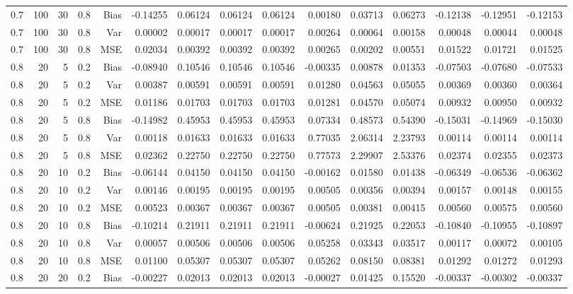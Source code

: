 \begin{table}[!htbp]
\begin{tabular}{lrrrrrrrrrrrrrr}
0.7 & 100 & 30 & 0.8 & Bias & -0.14255 & 0.06124 & 0.06124 & 0.06124 & 0.00180 & 0.03713 & 0.06273 & -0.12138 & -0.12951 & -0.12153 \\
0.7 & 100 & 30 & 0.8 & Var & 0.00002 & 0.00017 & 0.00017 & 0.00017 & 0.00264 & 0.00064 & 0.00158 & 0.00048 & 0.00044 & 0.00048 \\
0.7 & 100 & 30 & 0.8 & MSE & 0.02034 & 0.00392 & 0.00392 & 0.00392 & 0.00265 & 0.00202 & 0.00551 & 0.01522 & 0.01721 & 0.01525 \\
0.8 &  20 &  5 & 0.2 & Bias & -0.08940 & 0.10546 & 0.10546 & 0.10546 & -0.00335 & 0.00878 & 0.01353 & -0.07503 & -0.07680 & -0.07533 \\
0.8 &  20 &  5 & 0.2 & Var & 0.00387 & 0.00591 & 0.00591 & 0.00591 & 0.01280 & 0.04563 & 0.05055 & 0.00369 & 0.00360 & 0.00364 \\
0.8 &  20 &  5 & 0.2 & MSE & 0.01186 & 0.01703 & 0.01703 & 0.01703 & 0.01281 & 0.04570 & 0.05074 & 0.00932 & 0.00950 & 0.00932 \\
0.8 &  20 &  5 & 0.8 & Bias & -0.14982 & 0.45953 & 0.45953 & 0.45953 & 0.07334 & 0.48573 & 0.54390 & -0.15031 & -0.14969 & -0.15030 \\
0.8 &  20 &  5 & 0.8 & Var & 0.00118 & 0.01633 & 0.01633 & 0.01633 & 0.77035 & 2.06314 & 2.23793 & 0.00114 & 0.00114 & 0.00114 \\
0.8 &  20 &  5 & 0.8 & MSE & 0.02362 & 0.22750 & 0.22750 & 0.22750 & 0.77573 & 2.29907 & 2.53376 & 0.02374 & 0.02355 & 0.02373 \\
0.8 &  20 & 10 & 0.2 & Bias & -0.06144 & 0.04150 & 0.04150 & 0.04150 & -0.00162 & 0.01580 & 0.01438 & -0.06349 & -0.06536 & -0.06362 \\
0.8 &  20 & 10 & 0.2 & Var & 0.00146 & 0.00195 & 0.00195 & 0.00195 & 0.00505 & 0.00356 & 0.00394 & 0.00157 & 0.00148 & 0.00155 \\
0.8 &  20 & 10 & 0.2 & MSE & 0.00523 & 0.00367 & 0.00367 & 0.00367 & 0.00505 & 0.00381 & 0.00415 & 0.00560 & 0.00575 & 0.00560 \\
0.8 &  20 & 10 & 0.8 & Bias & -0.10214 & 0.21911 & 0.21911 & 0.21911 & -0.00624 & 0.21925 & 0.22053 & -0.10840 & -0.10955 & -0.10897 \\
0.8 &  20 & 10 & 0.8 & Var & 0.00057 & 0.00506 & 0.00506 & 0.00506 & 0.05258 & 0.03343 & 0.03517 & 0.00117 & 0.00072 & 0.00105 \\
0.8 &  20 & 10 & 0.8 & MSE & 0.01100 & 0.05307 & 0.05307 & 0.05307 & 0.05262 & 0.08150 & 0.08381 & 0.01292 & 0.01272 & 0.01293 \\
0.8 &  20 & 20 & 0.2 & Bias & -0.00227 & 0.02013 & 0.02013 & 0.02013 & -0.00027 & 0.01425 & 0.15520 & -0.00337 & -0.00302 & -0.00337 \\

\end{tabular}
\end{table}

